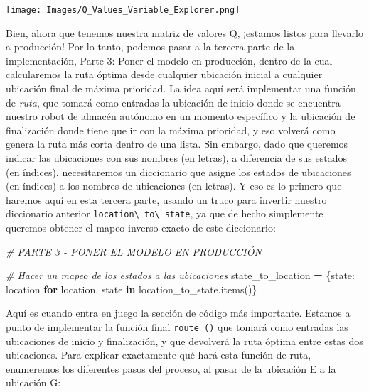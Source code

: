 \documentclass[
]{book}
\newenvironment{Shaded}{\begin{snugshade}}{\end{snugshade}}
\newcommand{\CommentTok}[1]{\textcolor[rgb]{0.56,0.35,0.01}{\textit{#1}}}
\newcommand{\ControlFlowTok}[1]{\textcolor[rgb]{0.13,0.29,0.53}{\textbf{#1}}}
\newcommand{\KeywordTok}[1]{\textcolor[rgb]{0.13,0.29,0.53}{\textbf{#1}}}
\newcommand{\NormalTok}[1]{#1}
\newcommand{\OperatorTok}[1]{\textcolor[rgb]{0.81,0.36,0.00}{\textbf{#1}}}
\begin{document}
\texttt{[image: Images/Q\_Values\_Variable\_Explorer.png]}

Bien, ahora que tenemos nuestra matriz de valores Q, ¡estamos listos para llevarlo a producción! Por lo tanto, podemos pasar a la tercera parte de la implementación, Parte 3: Poner el modelo en producción, dentro de la cual calcularemos la ruta óptima desde cualquier ubicación inicial a cualquier ubicación final de máxima prioridad. La idea aquí será implementar una función de \emph{ruta}, que tomará como entradas la ubicación de inicio donde se encuentra nuestro robot de almacén autónomo en un momento específico y la ubicación de finalización donde tiene que ir con la máxima prioridad, y eso volverá como genera la ruta más corta dentro de una lista. Sin embargo, dado que queremos indicar las ubicaciones con sus nombres (en letras), a diferencia de sus estados (en índices), necesitaremos un diccionario que asigne los estados de ubicaciones (en índices) a los nombres de ubicaciones (en letras). Y eso es lo primero que haremos aquí en esta tercera parte, usando un truco para invertir nuestro diccionario anterior \texttt{location\textbackslash{}\_to\textbackslash{}\_state}, ya que de hecho simplemente queremos obtener el mapeo inverso exacto de este diccionario:

\begin{Shaded}
\begin{Highlighting}[]
\CommentTok{\# PARTE 3 {-} PONER EL MODELO EN PRODUCCIÓN}

\CommentTok{\# Hacer un mapeo de los estados a las ubicaciones}
\NormalTok{state\_to\_location }\OperatorTok{=}\NormalTok{ \{state: location }\ControlFlowTok{for}\NormalTok{ location, state }\KeywordTok{in}\NormalTok{ location\_to\_state.items()\}}
\end{Highlighting}
\end{Shaded}

Aquí es cuando entra en juego la sección de código más importante. Estamos a punto de implementar la función final \texttt{route\ ()} que tomará como entradas las ubicaciones de inicio y finalización, y que devolverá la ruta óptima entre estas dos ubicaciones. Para explicar exactamente qué hará esta función de ruta, enumeremos los diferentes pasos del proceso, al pasar de la ubicación E a la ubicación G:
\end{document}
